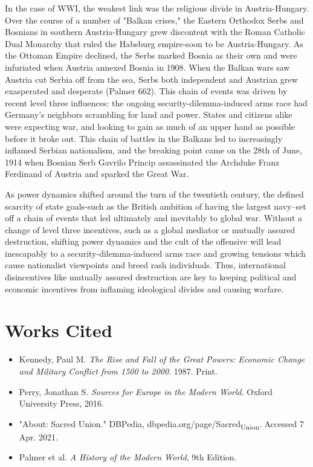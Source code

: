 \documentclass[11pt]{article}
\begin{document}
 \begin{doublespacing}

 In the case of WWI, the weakest link was the religious divide in Austria-Hungary. Over the course of a number of "Balkan crises," the Eastern Orthodox Serbs and Bosnians in southern Austria-Hungary grew discontent with the Roman Catholic Dual Monarchy that ruled the Habsburg empire-soon to be Austria-Hungary. As the Ottoman Empire declined, the Serbs marked Bosnia as their own and were infuriated when Austria annexed Bosnia in 1908. When the Balkan wars saw Austria cut Serbia off from the sea, Serbs both independent and Austrian grew exasperated and desperate (Palmer 662).
 This chain of events was driven by recent level three influences: the ongoing security-dilemma-induced arms race had Germany's neighbors scrambling for land and power. States and citizens alike were expecting war, and looking to gain as much of an upper hand as possible before it broke out.
 This chain of battles in the Balkans led to increasingly inflamed Serbian nationalism, and the breaking point came on the 28th of June, 1914 when Bosnian Serb Gavrilo Princip assassinated the Archduke Franz Ferdinand of Austria and sparked the Great War.

As power dynamics shifted around the turn of the twentieth century, the defined scarcity of state goals-such as the British ambition of having the largest navy--set off a chain of events that led ultimately and inevitably to global war. Without a change of level three incentives, such as a global mediator or mutually assured destruction, shifting power dynamics and the cult of the offensive will lead inescapably to a security-dilemma-induced arms race and growing tensions which cause nationalist viewpoints and breed rash individuals. Thus, international disincentives like mutually assured destruction are key to keeping political and economic incentives from inflaming ideological divides and causing warfare.

\end{doublespacing}

\section{Works Cited}
\label{sec:org22830fc}
\begin{itemize}
\item Kennedy, Paul M. \emph{The Rise and Fall of the Great Powers: Economic Change and Military Conflict from 1500 to 2000}. 1987. Print.
\item Perry, Jonathan S. \emph{Sources for Europe in the Modern World}. Oxford University Press, 2016.
\item "About: Sacred Union." DBPedia, dbpedia.org/page/Sacred\textsubscript{Union}. Accessed 7 Apr. 2021.
\item Palmer et al. \emph{A History of the Modern World}, 9th Edition.
\end{itemize}
\end{document}
